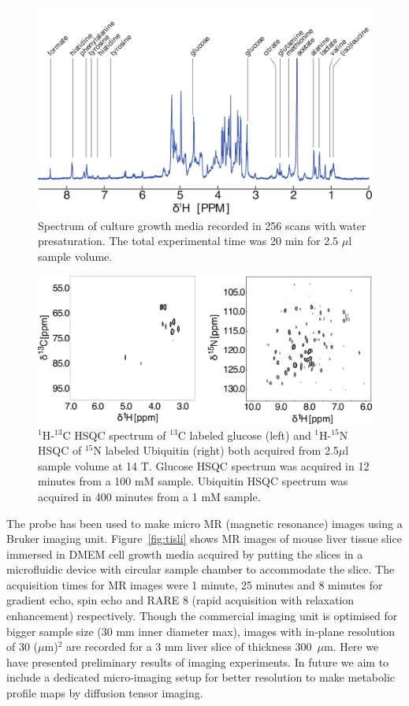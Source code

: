 \documentclass[preprint,12pt]{article}
\begin{document}
\begin{figure}
\centering
\includegraphics[width=\linewidth,keepaspectratio=true]{./figures/media-180125-005-bigger-font.png} 
\caption{Spectrum of culture growth media recorded in 256 scans with water presaturation. The total experimental time was 20 min for 2.5 $\mu$l sample volume.}
\label{fig:media-spec} 
\end{figure}
\begin{figure}
\centering
\includegraphics[width=\linewidth,keepaspectratio=true]{./figures/ms5n17-tlp-sp-180612-HSQCspect.png} 
\caption{$^1$H-$^{13}$C HSQC spectrum of $^{13}$C labeled glucose (left) and $^1$H-$^{15}$N HSQC of $^{15}$N labeled Ubiquitin (right) both acquired from 2.5$\mu$l sample volume at 14 T. Glucose HSQC spectrum was acquired in 12 minutes from a 100 mM sample. Ubiquitin HSQC spectrum was acquired in 400 minutes from a 1 mM sample.}
\label{fig:HSQC} 
\end{figure}
The probe has been used to make micro MR (magnetic resonance) images using a Bruker imaging unit. Figure~\ref{fig:tisli} shows MR images of mouse liver tissue slice immersed in DMEM cell growth media acquired by putting the slices in a microfluidic device with circular sample chamber to accommodate the slice. The acquisition times for MR images were 1 minute, 25 minutes and 8 minutes for gradient echo, spin echo and RARE 8 (rapid acquisition with relaxation enhancement) respectively. Though the commercial imaging unit is optimised for bigger sample size (30 mm inner diameter max), images with in-plane resolution of 30 ($\mu$m)$^{2}$ are recorded for a 3 mm liver slice of thickness 300~$\mu$m. Here we have presented preliminary results of imaging experiments. In future we aim to include a dedicated micro-imaging setup for better resolution to make metabolic profile maps by diffusion tensor imaging.
\end{document}
